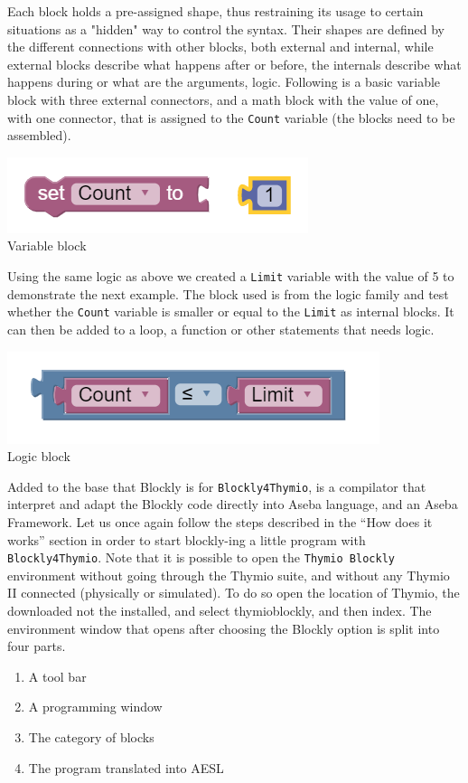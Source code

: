 \documentclass{scrbook}
\begin{document}
Each block holds a pre-assigned shape, thus restraining its usage to certain situations as a "hidden" way to control the syntax. Their shapes are defined by the different connections with other blocks, 
both external and internal, while external blocks describe what happens after or before, the internals describe what happens during or what are the arguments, logic. 
Following is a basic variable block with three external connectors, and a math block with the value of one, with one connector, that is assigned to the \texttt{Count} variable (the blocks need to be assembled). \\
\begin{center}
  \includegraphics[scale=0.5]{./Blockly/basic_variable}\\
  Variable block
\end{center}

Using the same logic as above we created a \texttt{Limit} variable with the value of 5 to demonstrate the next example. 
The block used is from the logic family and test whether the \texttt{Count} variable is smaller or equal to the \texttt{Limit} as internal blocks. 
It can then be added to a loop, a function or other statements that needs logic.\\
\begin{center}
  \includegraphics[scale=0.5]{./Blockly/basic_logic}\\
  Logic block
\end{center}

Added to the base that Blockly is for \texttt{Blockly4Thymio}, is a compilator that interpret and adapt the Blockly code directly into Aseba language, and an Aseba Framework. 
Let us once again follow the steps described in the “How does it works” section in order to start blockly-ing a little program with \texttt{Blockly4Thymio}. 
Note that it is possible to open the \texttt{Thymio Blockly} environment without going through the Thymio suite, and without any Thymio II connected (physically or simulated). 
To do so open the location of Thymio, the downloaded not the installed, and select thymio\textunderscore blockly, and then index.
The environment window that opens after choosing the Blockly option is split into four parts.
\begin{enumerate}
  \item A tool bar
  \item A programming window
  \item The category of blocks
  \item The program translated into AESL
\end{enumerate}
\end{document}
